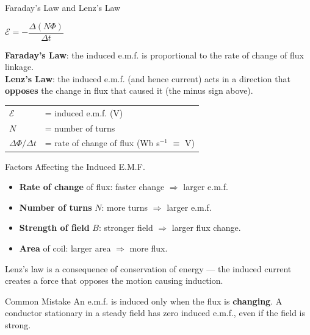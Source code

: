 \begin{formulabox}{Faraday's Law and Lenz's Law}
\begin{center}
\large $\mathcal{E} = -\dfrac{\Delta(N\Phi)}{\Delta t}$
\end{center}
\vspace{0.3em}
\textbf{Faraday's Law}: the induced e.m.f. is proportional to the rate of change of flux linkage.\\[0.3em]
\textbf{Lenz's Law}: the induced e.m.f. (and hence current) acts in a direction that \textbf{opposes} the change in flux that caused it (the minus sign above).
\vspace{0.3em}
\begin{tabular}{@{}ll@{}}
$\mathcal{E}$ & = induced e.m.f. (V) \\
$N$ & = number of turns \\
$\Delta\Phi/\Delta t$ & = rate of change of flux (Wb s$^{-1}$ $\equiv$ V) \\
\end{tabular}
\end{formulabox}

\begin{keybox}{Factors Affecting the Induced E.M.F.}
\begin{itemize}[itemsep=2pt]
  \item \textbf{Rate of change} of flux: faster change $\Rightarrow$ larger e.m.f.
  \item \textbf{Number of turns} $N$: more turns $\Rightarrow$ larger e.m.f.
  \item \textbf{Strength of field} $B$: stronger field $\Rightarrow$ larger flux change.
  \item \textbf{Area} of coil: larger area $\Rightarrow$ more flux.
\end{itemize}
Lenz's law is a consequence of conservation of energy — the induced current creates a force that opposes the motion causing induction.
\end{keybox}

\begin{warningbox}{Common Mistake}
An e.m.f. is induced only when the flux is \textbf{changing}. A conductor stationary in a steady field has zero induced e.m.f., even if the field is strong.
\end{warningbox}



